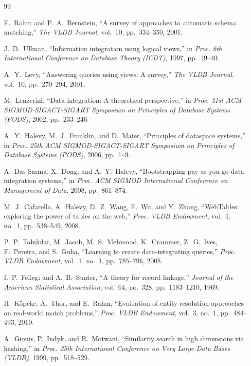 \documentclass[12pt,a4paper]{report}
\begin{document}
\begin{thebibliography}{99}

 E.~Rahm and P.~A.~Bernstein, ``A survey of approaches to automatic schema matching,'' \emph{The VLDB Journal}, vol.~10, pp.~334--350, 2001.

 J.~D.~Ullman, ``Information integration using logical views,'' in \emph{Proc. 6th International Conference on Database Theory (ICDT)}, 1997, pp.~19--40.

 A.~Y.~Levy, ``Answering queries using views: A survey,'' \emph{The VLDB Journal}, vol.~10, pp.~270--294, 2001.

 M.~Lenzerini, ``Data integration: A theoretical perspective,'' in \emph{Proc. 21st ACM SIGMOD-SIGACT-SIGART Symposium on Principles of Database Systems (PODS)}, 2002, pp.~233--246.

 A.~Y.~Halevy, M.~J.~Franklin, and D.~Maier, ``Principles of dataspace systems,'' in \emph{Proc. 25th ACM SIGMOD-SIGACT-SIGART Symposium on Principles of Database Systems (PODS)}, 2006, pp.~1--9.

 A.~Das Sarma, X.~Dong, and A.~Y.~Halevy, ``Bootstrapping pay-as-you-go data integration systems,'' in \emph{Proc. ACM SIGMOD International Conference on Management of Data}, 2008, pp.~861--874.

 M.~J.~Cafarella, A.~Halevy, D.~Z.~Wang, E.~Wu, and Y.~Zhang, ``WebTables: exploring the power of tables on the web,'' \emph{Proc. VLDB Endowment}, vol.~1, no.~1, pp.~538--549, 2008.

 P.~P.~Talukdar, M.~Jacob, M.~S.~Mehmood, K.~Crammer, Z.~G.~Ives, F.~Pereira, and S.~Guha, ``Learning to create data-integrating queries,'' \emph{Proc. VLDB Endowment}, vol.~1, no.~1, pp.~785--796, 2008.

 I.~P.~Fellegi and A.~B.~Sunter, ``A theory for record linkage,'' \emph{Journal of the American Statistical Association}, vol.~64, no.~328, pp.~1183--1210, 1969.

 H.~Köpcke, A.~Thor, and E.~Rahm, ``Evaluation of entity resolution approaches on real-world match problems,'' \emph{Proc. VLDB Endowment}, vol.~3, no.~1, pp.~484--493, 2010.

 A.~Gionis, P.~Indyk, and R.~Motwani, ``Similarity search in high dimensions via hashing,'' in \emph{Proc. 25th International Conference on Very Large Data Bases (VLDB)}, 1999, pp.~518--529.


\end{thebibliography}
\end{document}
